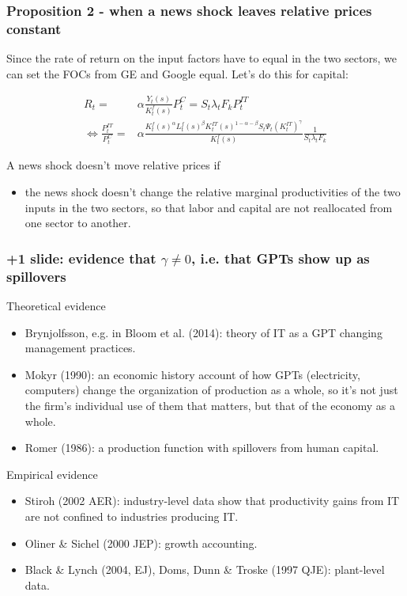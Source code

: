\documentclass{beamer}
\begin{document}
\begin{frame}
\frametitle{Proposition 2 - when a news shock leaves relative prices constant}

Since the rate of return on the input factors have to equal in the two sectors, we can set the FOCs from GE and Google equal. Let's do this for capital:

\begin{align*}
R_t = & \alpha \frac{Y_t(s)}{K^f_t(s)} P^C_t = S_t \lambda_t F_k P^{IT}_t \\
\Leftrightarrow \frac{P^{IT}_t }{P^{C}_t } = & \alpha \frac{K^f_t(s)^{\alpha}L^f_t(s)^{\beta}K^{IT}_t(s)^{1-\alpha - \beta}S_t \Psi_t (K^{IT}_t)^{\gamma} }{K^f_t(s)} \frac{1}{S_t \lambda_t F_k}
\end{align*}


A news shock doesn't move relative prices if 
\begin{itemize}
\item the news shock doesn't change the relative marginal productivities of the two inputs in the two sectors, so that labor and capital are not reallocated from one sector to another.
\end{itemize}

\end{frame}

\begin{frame}
\frametitle{+1 slide: evidence that $\gamma \neq 0$, i.e. that GPTs show up as spillovers}

Theoretical evidence
\begin{itemize}
\item Brynjolfsson, e.g. in Bloom et al. (2014): theory of IT as a GPT changing management practices.
\item Mokyr (1990):  an economic history account of how GPTs (electricity, computers) change the organization of production as a whole, so it's not just the firm's individual use of them that matters, but that of the economy as a whole.
\item Romer (1986): a production function with spillovers from human capital.
\end{itemize}

Empirical evidence
\begin{itemize}
\item Stiroh (2002 AER): industry-level data show that productivity gains from IT are not confined to industries producing IT.
\item Oliner \& Sichel (2000 JEP): growth accounting.
\item Black \& Lynch (2004, EJ), Doms, Dunn \& Troske (1997 QJE): plant-level data.
\end{itemize}

\end{frame}
\end{document}
